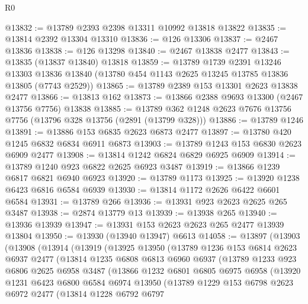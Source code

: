 \begin{lexlean}{R0}
\begin{coremodule}
@13832 := @13789 @2393 @2398 @13311 @10992 @13818 @13822
@13835 := @13814 @2392 @13304 @13310
@13836 := @126 @13306
@13837 := @2467 @13836
@13838 := @126 @13298
@13840 := @2467 @13838 @2477
@13843 := @13835 (@13837 @13840) @13818
@13859 := @13789
    @1739
    @2391
    @13246
    @13303
    @13836
    @13840
    (@13780 @454 @1143 @2625 @13245 @13785 @13836 @13805 (@7743 @2529))
@13865 := @13789 @2389 @153 @13301 @2623 @13838 @2477
@13866 := @13813 @162
@13873 := @13866 @2388 @9693 @13300 (@2467 @13756 @7756) @13838
@13885 := @13789 @362 @1248 @2623 @7676 @13756 @7756 (@13796 @328 @13756 (@2891 (@13799 @328)))
@13886 := @13789 @1246
@13891 := @13886 @153 @6835 @2623 @6873 @2477
@13897 := @13780 @420 @1245 @6832 @6834 @6911 @6873
@13903 := @13789 @1243 @153 @6830 @2623 @6909 @2477
@13908 := @13814 @1242 @6824 @6829 @6925 @6909
@13914 := @13789 @1240 @923 @6822 @2625 @6923 @3487
@13919 := @13866 @1239 @6817 @6821 @6940 @6923
@13920 := @13789 @1173
@13925 := @13920 @1238 @6423 @6816 @6584 @6939
@13930 := @13814 @1172 @2626 @6422 @6601 @6584
@13931 := @13789 @266
@13936 := @13931 @923 @2623 @2625 @265 @3487
@13938 := @2874 @13779 @13
@13939 := @13938 @265
@13940 := @13936 @13939
@13947 := @13931 @153 @2623 @2623 @265 @2477 @13939 @13804
@13950 := @13930 (@13940 @13947) @6613
@14058 := @13897
    (@13903
      (@13908
        (@13914
          (@13919
            (@13925
              @13950
              (@13789
                @1236
                @153
                @6814
                @2623
                @6937
                @2477
                (@13814
                  @1235
                  @6808
                  @6813
                  @6960
                  @6937
                  (@13789
                    @1233
                    @923
                    @6806
                    @2625
                    @6958
                    @3487
                    (@13866
                      @1232
                      @6801
                      @6805
                      @6975
                      @6958
                      (@13920
                        @1231
                        @6423
                        @6800
                        @6584
                        @6974
                        @13950
                        (@13789
                          @1229
                          @153
                          @6798
                          @2623
                          @6972
                          @2477
                          (@13814
                            @1228
                            @6792
                            @6797

\end{coremodule}
\end{lexlean}
